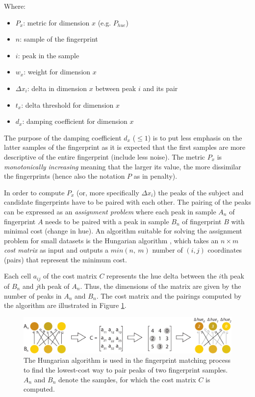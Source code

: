 \documentclass[thesis.tex]{subfiles}
\begin{document}
Where:
\begin{itemize}[label=]
	\setlength\itemsep{0.10em}
    \item $P_x$: metric for dimension $x$ (e.g. $P_{hue}$)
    \item $n$: sample of the fingerprint
    \item $i$: peak in the sample
    \item $w_x$: weight for dimension $x$
    \item $\Delta{x_i}$: delta in dimension $x$ between peak $i$ and its pair
    \item $t_x$: delta threshold for dimension $x$
    \item $d_x$: damping coefficient for dimension $x$
\end{itemize}

\noindent The purpose of the damping coefficient $d_x$ ($\leq 1$) is to put less emphasis on the latter samples of the fingerprint as it is expected that the first samples are more descriptive of the entire fingerprint (include less noise). The metric $P_x$ is \emph{monotonically increasing} meaning that the larger its value, the more dissimilar the fingerprints (hence also the notation $P$ as in penalty).

In order to compute $P_x$ (or, more specifically $\Delta{x_i}$) the peaks of the subject and candidate fingerprints have to be paired with each other. The pairing of the peaks can be expressed as an \emph{assignment problem} where each peak in sample $A_n$ of fingerprint $A$ needs to be paired with a peak in sample $B_n$ of fingerprint $B$ with minimal cost (change in hue). An algorithm suitable for solving the assignment problem for small datasets is the Hungarian algorithm \cite{hungarian_algorithm}, which takes an $n \times m$ \emph{cost matrix} as input and outputs a $min (n,\ m)$ number of $(i, j)$ coordinates (pairs) that represent the minimum cost.

Each cell $a_{ij}$ of the cost matrix $C$ represents the hue delta between the $i$th peak of $B_n$ and $j$th peak of $A_n$. Thus, the dimensions of the matrix are given by the number of peaks in $A_n$ and $B_n$. The cost matrix and the pairings computed by the algorithm are illustrated in Figure \ref{figure:hungarian-algorithm}.

\begin{figure}[h]
\centering \includegraphics[width=\textwidth,height=\textheight,keepaspectratio=true]{images/design_implementation/hungarian_algorithm}
\caption{The Hungarian algorithm is used in the fingerprint matching process to find the lowest-cost way to pair peaks of two fingerprint samples. $A_n$ and $B_n$ denote the samples, for which the cost matrix $C$ is computed.\label{figure:hungarian-algorithm}}
\end{figure}
\end{document}
